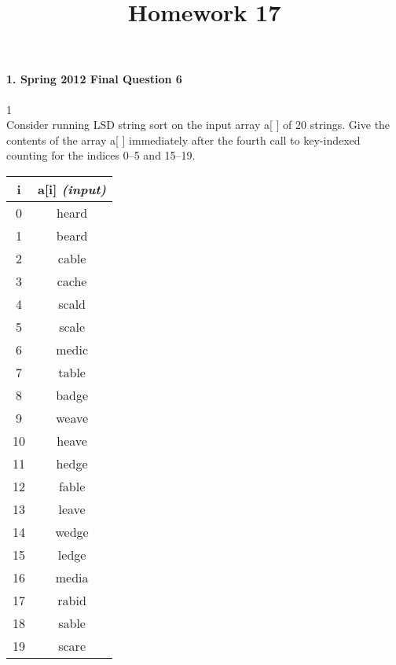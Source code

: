 \documentclass{article}
\begin{document}
\title{Homework 17}
\date{}
\maketitle


\paragraph{\Large 1. Spring 2012 Final Question 6}1\mbox{}\\
Consider running LSD string sort on the input array a[ ] of 20 strings. Give the contents of the array a[ ] immediately after the fourth call to key-indexed counting for the indices 0--5 and 15--19.\\

\begin{tabular}{c | c}
i & a[i] \textit{(input)}\\ \hline
0 & heard\\ \hline
1 & beard\\ \hline
2 & cable\\ \hline
3 & cache\\ \hline
4 & scald\\ \hline
5 & scale\\ \hline
6 & medic\\ \hline
7 & table\\ \hline
8 & badge\\ \hline
9 & weave\\ \hline
10 & heave\\ \hline
11 & hedge\\ \hline
12 & fable\\ \hline
13 & leave\\ \hline
14 & wedge\\ \hline
15 & ledge\\ \hline
16 & media\\ \hline
17 & rabid\\ \hline
18 & sable\\ \hline
19 & scare
\end{tabular}
\quad\quad
\end{document}
